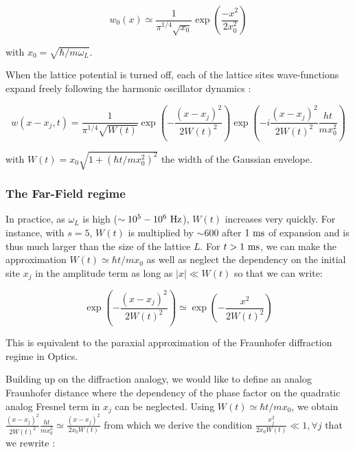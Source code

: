 \begin{equation}
    w_0(x) \simeq \frac{1}{\pi^{1 / 4} \sqrt{x_{0}}} \exp \left(\frac{-x^{2}}{2 x_{0}^{2}}\right)
\end{equation}

\noindent with $x_{0}=\sqrt{\hbar / m \omega_{L}}$.

When the lattice potential is turned off, each of the lattice sites wave-functions expand freely following the harmonic oscillator dynamics \cite{toth2008theory}:

\begin{equation}
    w\left(x-x_{j}, t\right)=\frac{1}{\pi^{1 / 4} \sqrt{W(t)}} \exp \left(-\frac{\left(x-x_{j}\right)^{2}}{2 W(t)^{2}}\right) \exp \left(-i \frac{\left(x-x_{j}\right)^{2}}{2 W(t)^{2}} \frac{h t}{m x_{0}^{2}}\right)
    \label{eq:time_dependent_wannier}
\end{equation}

\noindent with $W(t)=x_{0} \sqrt{1+\left(\hbar t / m x_{0}^{2}\right)^{2}}$ the width of the Gaussian envelope.

\subsubsection{The Far-Field regime}

In practice, as $\omega_L$ is high ($\sim 10^5-10^6 \ \rm{Hz}$), $W(t)$ increases very quickly. For instance, with $s=5$, $W(t)$ is multiplied by $\sim 600$ after $1 \ \rm{ms}$ of expansion and is thus much larger than the size of the lattice $L$. For $t>1 \ \rm{ms}$, we can make the approximation $W(t) \simeq \hbar t/m x_0$ as well as neglect the dependency on the initial site $x_j$ in the amplitude term as long as $|x| \ll W(t)$ so that we can write:

\begin{equation}
    \exp \left(-\frac{\left(x-x_{j}\right)^{2}}{2 W(t)^{2}}\right) \simeq \exp \left(-\frac{x^{2}}{2 W(t)^{2}}\right)
\end{equation}

\noindent This is equivalent to the paraxial approximation of the Fraunhofer diffraction regime in Optics.

Building up on the diffraction analogy, we would like to define an analog Fraunhofer distance where the dependency of the phase factor on the quadratic analog Fresnel term in $x_j$ can be neglected. Using $W(t) \simeq \hbar t/m x_0$, we obtain $\frac{\left(x-x_{j}\right)^{2}}{2 W(t)^{2}} \frac{h t}{m x_{0}^{2}} \simeq \frac{\left(x-x_{j}\right)^{2}}{2 x_0 W(t)}$ from which we derive the condition $\frac{x_j^2}{2 x_0 W(t)} \ll 1, \forall j$ that we rewrite \cite{gerbier2008expansion,toth2008theory}:

